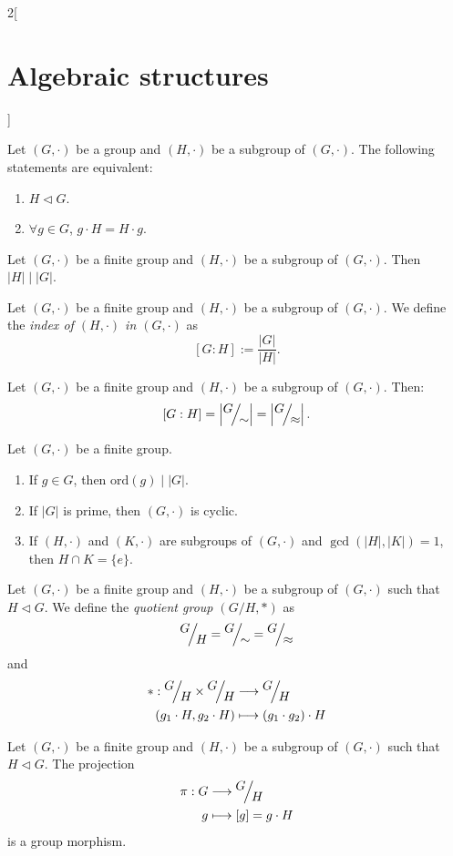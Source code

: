 \documentclass[../../../main.tex]{subfiles}
\begin{document}
\begin{multicols}{2}[\section{Algebraic structures}]
\begin{prop}
    Let $(G,\cdot)$ be a group and $(H,\cdot)$ be a subgroup of $(G,\cdot)$. The following statements are equivalent:
    \begin{enumerate}
        \item $H\lhd G$.
        \item $\forall g\in G$, $g\cdot H=H\cdot g$.
    \end{enumerate}
\end{prop}
\begin{theorem}
    Let $(G,\cdot)$ be a finite group and $(H,\cdot)$ be a subgroup of $(G,\cdot)$. Then $|H|\mid|G|$.
\end{theorem}
\begin{definition}
    Let $(G,\cdot)$ be a finite group and $(H,\cdot)$ be a subgroup of $(G,\cdot)$. We define the \textit{index of $(H,\cdot)$ in $(G,\cdot)$} as $$[G:H]:=\frac{|G|}{|H|}.$$
\end{definition}
\begin{corollary}
    Let $(G,\cdot)$ be a finite group and $(H,\cdot)$ be a subgroup of $(G,\cdot)$. Then: $$[G:H]=\left|\quot{G}{\sim}\right|=\left|\quot{G}{\approx}\right|.$$
\end{corollary}
\begin{corollary}
    Let $(G,\cdot)$ be a finite group. 
    \begin{enumerate}
        \item If $g\in G$, then $\text{ord}(g)\mid |G|$.
        \item If $|G|$ is prime, then $(G,\cdot)$ is cyclic.
        \item If $(H,\cdot)$ and $(K,\cdot)$ are subgroups of $(G,\cdot)$ and $\gcd(|H|,|K|)=1$, then $H\cap K=\{e\}$.
    \end{enumerate}
\end{corollary}
\begin{definition}
    Let $(G,\cdot)$ be a finite group and $(H,\cdot)$ be a subgroup of $(G,\cdot)$ such that $H\lhd G$. We define the \textit{quotient group $\left(G/H,*\right)$} as $$\quot{G}{H}=\quot{G}{\sim}=\quot{G}{\approx}$$ and 
\begin{align*}
    *:\quot{G}{H}\times\quot{G}{H}&\longrightarrow\quot{G}{H}\\
    (g_1\cdot H,g_2\cdot H)&\longmapsto (g_1\cdot g_2)\cdot H
\end{align*}
\end{definition}
\begin{lemma}
Let $(G,\cdot)$ be a finite group and $(H,\cdot)$ be a subgroup of $(G,\cdot)$ such that $H\lhd G$. The projection 
\begin{align*}
    \pi:G&\longrightarrow\quot{G}{H}\\
    g&\longmapsto[g]=g\cdot H
\end{align*}
is a group morphism.
\end{lemma}

\end{multicols}
\end{document}
